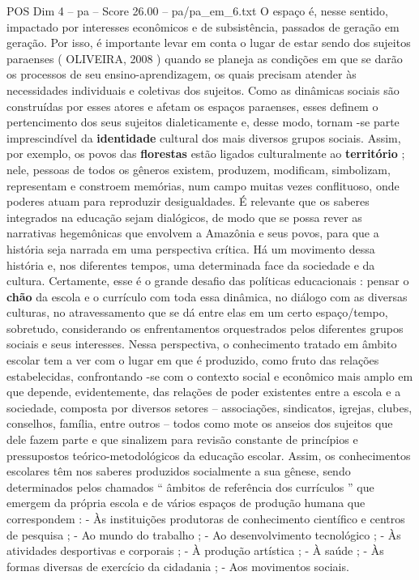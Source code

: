 \begin{textsample}{POS Dim 4 – pa – Score 26.00 – pa/pa\_em\_6.txt}
O espaço é, nesse sentido, impactado por interesses econômicos e de subsistência, passados de geração em geração.
Por isso, é importante levar em conta o lugar de estar sendo dos sujeitos paraenses ( OLIVEIRA, 2008 ) quando se planeja as condições em que se darão os processos de seu ensino-aprendizagem, os quais precisam atender às necessidades individuais e coletivas dos sujeitos.
Como as dinâmicas sociais são construídas por esses atores e afetam os espaços paraenses, esses definem o pertencimento dos seus sujeitos dialeticamente e, desse modo, tornam -se parte imprescindível da \textbf{identidade} cultural dos mais diversos grupos sociais.
Assim, por exemplo, os povos das \textbf{florestas} estão ligados culturalmente ao \textbf{território} ; nele, pessoas de todos os gêneros existem, produzem, modificam, simbolizam, representam e constroem memórias, num campo muitas vezes conflituoso, onde poderes atuam para reproduzir desigualdades.
É relevante que os saberes integrados na educação sejam dialógicos, de modo que se possa rever as narrativas hegemônicas que envolvem a Amazônia e seus povos, para que a história seja narrada em uma perspectiva crítica.
Há um movimento dessa história e, nos diferentes tempos, uma determinada face da sociedade e da cultura.
Certamente, esse é o grande desafio das políticas educacionais : pensar o \textbf{chão} da escola e o currículo com toda essa dinâmica, no diálogo com as diversas culturas, no atravessamento que se dá entre elas em um certo espaço/tempo, sobretudo, considerando os enfrentamentos orquestrados pelos diferentes grupos sociais e seus interesses.
Nessa perspectiva, o conhecimento tratado em âmbito escolar tem a ver com o lugar em que é produzido, como fruto das relações estabelecidas, confrontando -se com o contexto social e econômico mais amplo em que depende, evidentemente, das relações de poder existentes entre a escola e a sociedade, composta por diversos setores – associações, sindicatos, igrejas, clubes, conselhos, família, entre outros – todos como mote os anseios dos sujeitos que dele fazem parte e que sinalizem para revisão constante de princípios e pressupostos teórico-metodológicos da educação escolar.
Assim, os conhecimentos escolares têm nos saberes produzidos socialmente a sua gênese, sendo determinados pelos chamados “ âmbitos de referência dos currículos ” que emergem da própria escola e de vários espaços de produção humana que correspondem : - Às instituições produtoras de conhecimento científico e centros de pesquisa ; - Ao mundo do trabalho ; - Ao desenvolvimento tecnológico ; - Às atividades desportivas e corporais ; - À produção artística ; - À saúde ; - Às formas diversas de exercício da cidadania ; - Aos movimentos sociais.

\end{textsample}
